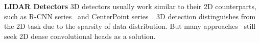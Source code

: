 \documentclass[10pt,twocolumn,letterpaper]{article}
\begin{document}
\noindent
\textbf{LIDAR Detectors}
3D detectors usually work similar to their 2D counterparts, such as R-CNN series~\cite{voxel-rcnn, pyramid-rcnn, pvrcnn, graph-rcnn} and CenterPoint series~\cite{centerpoint,centernet,centertrack}. 3D detection distinguishes from the 2D task due to the sparsity of data distribution. But many approaches~\cite{voxelnet,second,centerpoint,voxel-rcnn} still seek 2D dense convolutional heads as a solution.

\begin{comment}
\begin{table}[t]
\begin{center}
\caption{Computation and performance comparison with mainstream 3D object detectors on nuScenes dataset. VoxelNeXt presents better performance than others, with high efficiency.}
\resizebox{\linewidth}{!}{
\begin{tabular}{|l|cc|cc|c|}
\hline
\multirow{2}{*}{\em Method} & \multirow{2}{*}{mAP} & \multirow{2}{*}{NDS} & \multicolumn{2}{c|}{FLOPs} & \multirow{2}{*}{Latency} \\
                        &                      &                      & Sparse CNN    & Head  &  \\ \hline
CenterPoint~\cite{centerpoint}             & 58.6                 & 66.2                 & 62.9 G  & 123.7 G & 96 ms \\
VoxelNeXt               & \textbf{60.0}    & \textbf{67.1}                 & \textbf{33.6 G} & \textbf{5.1 G}  & 66 ms \\ \hline
\end{tabular}}
\label{tab:computation-comparison}
\end{center}
\end{table}
\end{comment}
\end{document}
